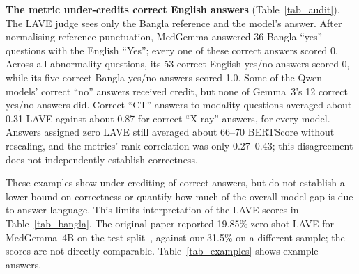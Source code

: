 \documentclass[doublecolumn]{ijcvsplatex}
\newcommand{\gemma}{Gemma~3}
\newcommand{\medgemma}{MedGemma}
\begin{document}
\textbf{The metric under-credits correct English answers} (Table~\ref{tab_audit}). The LAVE judge sees only the Bangla reference and the model's answer. After normalising reference punctuation, \medgemma{} answered 36 Bangla ``yes'' questions with the English ``Yes''; every one of these correct answers scored 0. Across all abnormality questions, its 53 correct English yes/no answers scored 0, while its five correct Bangla yes/no answers scored 1.0. Some of the Qwen models' correct ``no'' answers received credit, but none of \gemma{}'s 12 correct yes/no answers did. Correct ``CT'' answers to modality questions averaged about 0.31 LAVE against about 0.87 for correct ``X-ray'' answers, for every model. Answers assigned zero LAVE still averaged about 66--70 BERTScore without rescaling, and the metrics' rank correlation was only 0.27--0.43; this disagreement does not independently establish correctness.

\begin{table}[tb]
\centering
\caption{Audit of LAVE using rule-based checks (100 questions per category). Top: correct English/Bangla yes/no answers, including explicit negative phrases, after case and punctuation normalisation; counts credited by LAVE ($>0$). Bottom: broad modality matches using English/Bangla synonyms, including radiography as X-ray and fMRI as MRI.}
\label{tab_audit}
\footnotesize
\setlength{\tabcolsep}{3pt}
\end{table}

These examples show under-crediting of correct answers, but do not establish a lower bound on correctness or quantify how much of the overall model gap is due to answer language. This limits interpretation of the LAVE scores in Table~\ref{tab_bangla}. The original paper reported 19.85\% zero-shot LAVE for \medgemma{}~4B on the test split~\cite{ahmed2026banglamedvqa}, against our 31.5\% on a different sample; the scores are not directly comparable. Table~\ref{tab_examples} shows example answers.
\end{document}

